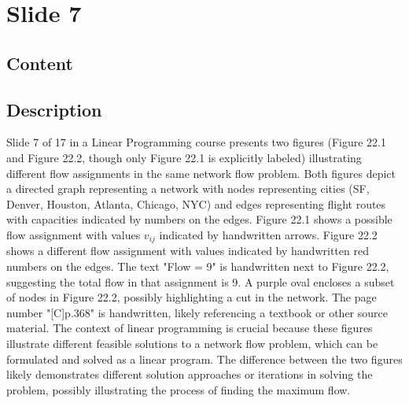 \documentclass{article}%
\begin{document}
%
\newpage%
\section{Slide 7}%
\label{sec:Slide7}%
\subsection{Content}%

%
\subsection{Description}%
Slide 7 of 17 in a Linear Programming course presents two figures (Figure 22.1 and Figure 22.2, though only Figure 22.1 is explicitly labeled) illustrating different flow assignments in the same network flow problem. Both figures depict a directed graph representing a network with nodes representing cities (SF, Denver, Houston, Atlanta, Chicago, NYC) and edges representing flight routes with capacities indicated by numbers on the edges. Figure 22.1 shows a possible flow assignment with values $v_{ij}$ indicated by handwritten arrows. Figure 22.2 shows a different flow assignment with values indicated by handwritten red numbers on the edges. The text "Flow = 9" is handwritten next to Figure 22.2, suggesting the total flow in that assignment is 9. A purple oval encloses a subset of nodes in Figure 22.2, possibly highlighting a cut in the network. The page number "[C]p.368" is handwritten, likely referencing a textbook or other source material. The context of linear programming is crucial because these figures illustrate different feasible solutions to a network flow problem, which can be formulated and solved as a linear program. The difference between the two figures likely demonstrates different solution approaches or iterations in solving the problem, possibly illustrating the process of finding the maximum flow.%
\end{document}
